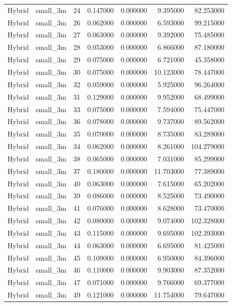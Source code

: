 \begin{tabular}{llrrrrr}
Hybrid & small_3m & 24 & 0.147000 & 0.000000 & 9.395000 & 82.253000 \\
Hybrid & small_3m & 26 & 0.062000 & 0.000000 & 6.593000 & 99.215000 \\
Hybrid & small_3m & 27 & 0.063000 & 0.000000 & 9.392000 & 75.485000 \\
Hybrid & small_3m & 28 & 0.053000 & 0.000000 & 6.866000 & 87.180000 \\
Hybrid & small_3m & 29 & 0.075000 & 0.000000 & 6.721000 & 45.358000 \\
Hybrid & small_3m & 30 & 0.075000 & 0.000000 & 10.123000 & 78.447000 \\
Hybrid & small_3m & 32 & 0.059000 & 0.000000 & 5.925000 & 96.264000 \\
Hybrid & small_3m & 31 & 0.129000 & 0.000000 & 9.952000 & 68.499000 \\
Hybrid & small_3m & 33 & 0.075000 & 0.000000 & 7.594000 & 75.447000 \\
Hybrid & small_3m & 36 & 0.078000 & 0.000000 & 9.737000 & 89.562000 \\
Hybrid & small_3m & 35 & 0.070000 & 0.000000 & 8.735000 & 83.289000 \\
Hybrid & small_3m & 34 & 0.062000 & 0.000000 & 8.261000 & 104.279000 \\
Hybrid & small_3m & 38 & 0.065000 & 0.000000 & 7.031000 & 85.299000 \\
Hybrid & small_3m & 37 & 0.180000 & 0.000000 & 11.703000 & 77.389000 \\
Hybrid & small_3m & 40 & 0.063000 & 0.000000 & 7.615000 & 65.202000 \\
Hybrid & small_3m & 39 & 0.086000 & 0.000000 & 8.525000 & 73.490000 \\
Hybrid & small_3m & 41 & 0.076000 & 0.000000 & 8.628000 & 73.470000 \\
Hybrid & small_3m & 42 & 0.080000 & 0.000000 & 9.074000 & 102.328000 \\
Hybrid & small_3m & 43 & 0.115000 & 0.000000 & 9.695000 & 102.393000 \\
Hybrid & small_3m & 44 & 0.063000 & 0.000000 & 6.695000 & 81.425000 \\
Hybrid & small_3m & 45 & 0.109000 & 0.000000 & 6.950000 & 84.396000 \\
Hybrid & small_3m & 46 & 0.110000 & 0.000000 & 9.903000 & 87.352000 \\
Hybrid & small_3m & 47 & 0.071000 & 0.000000 & 9.766000 & 69.377000 \\
Hybrid & small_3m & 49 & 0.121000 & 0.000000 & 11.754000 & 79.647000 \\

\end{tabular}
